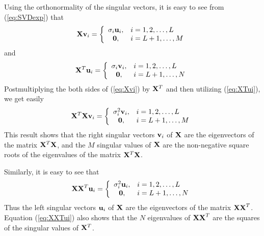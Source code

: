 \begin{enumerate}
\begin{solution}
    Using the orthonormality of the singular vectors, it is easy to see from
    (\ref{eq:SVDexp}) that 
    \begin{equation}
      {\bf Xv}_i = \left\{ \begin{array}{cl}
          \sigma_i {\bf u}_i, & i=1,2,\ldots,L \\
          {\bf 0}, & i=L+1,\ldots,M 
        \end{array} \right.
      \label{eq:Xvi}
    \end{equation}
    and 
    \begin{equation}
      {\bf X}^T{\bf u}_i = \left\{ \begin{array}{cl}
          \sigma_i {\bf v}_i, & i=1,2,\ldots,L \\
          {\bf 0}, & i=L+1,\ldots,N 
        \end{array} \right.
      \label{eq:XTui}
    \end{equation}
    Postmultiplying the both sides of (\ref{eq:Xvi}) by ${\bf X}^T$ and then utilizing
    (\ref{eq:XTui}), we get easily
    \begin{equation}
      {\bf X}^T{\bf Xv}_i = \left\{ \begin{array}{cl}
          \sigma_i^2 {\bf v}_i, & i=1,2,\ldots,L \\
          {\bf 0}, & i=L+1,\ldots,M 
        \end{array} \right.
      \label{eq:XTXvi}
    \end{equation}
    This result shows that the right singular vectors ${\bf v}_i$ of ${\bf X}$ are the
    eigenvectors of the matrix ${\bf X}^T{\bf X}$, and the $M$ singular values of 
    ${\bf X}$ are the non-negative square roots of the eigenvalues of the matrix
    ${\bf X}^T{\bf X}$.

    Similarly, it is easy to see that
    \begin{equation}
      {\bf XX}^T{\bf u}_i = \left\{ \begin{array}{cl}
          \sigma_i^2 {\bf u}_i, & i=1,2,\ldots,L \\
          {\bf 0}, & i=L+1,\ldots,N 
        \end{array} \right.
      \label{eq:XXTui}
    \end{equation}
    Thus the left singular vectors ${\bf u}_i$ of ${\bf X}$ are the eigenvectors of the
    matrix ${\bf XX}^T$. Equation (\ref{eq:XXTui}) also shows that the $N$ eigenvalues of 
    ${\bf XX}^T$ are the squares of the singular values of ${\bf X}^T$.


\end{solution}
\end{enumerate}
